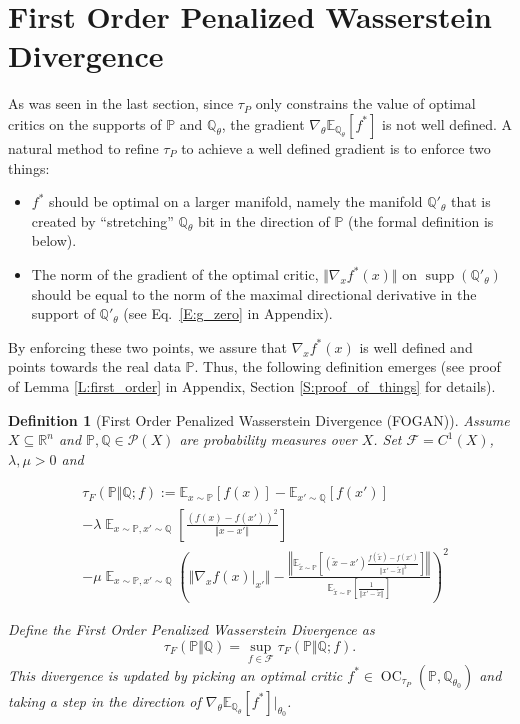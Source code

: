 \documentclass{article}
\DeclareMathOperator{\supp}{supp}
\DeclareMathOperator{\oc}{OC}
\DeclareMathOperator*{\myexpectation}{\mathbb{E}}
\newtheorem{definition}{Definition}
\begin{document}
 \section{First Order Penalized Wasserstein Divergence}\label{S:fo_divergence}
 As was seen in the last section, since $\tau_P$ only constrains the value of optimal critics on the supports of $\mathbb P$ and $\mathbb Q_\theta$,
 the gradient $\nabla_\theta\mathbb E_{\mathbb Q_\theta}[f^*]$ is not well defined. A natural method to refine $\tau_P$ to achieve
 a well defined gradient is to enforce two things:
 \begin{itemize}
  \item $f^*$ should be optimal on a larger manifold, namely the manifold $\mathbb Q'_\theta$ that is created by
 ``stretching'' $\mathbb Q_\theta$ bit in the direction of $\mathbb P$ (the formal definition is below). 
  \item The norm of the gradient of the optimal critic, $\Vert\nabla_x f^*(x) \Vert$ on $\supp(\mathbb Q'_\theta)$ should be equal to the norm of the maximal directional
  derivative in the support of $\mathbb Q'_\theta$ (see Eq.\ \ref{E:g_zero} in Appendix).
 \end{itemize}
 By enforcing these two points, we assure that $\nabla_x f^*(x)$ is well defined and points towards the real data $\mathbb P$. Thus, the following
 definition emerges (see proof of Lemma \ref{L:first_order} in Appendix, Section \ref{S:proof_of_things} for details).
 \begin{definition}[First Order Penalized Wasserstein Divergence (FOGAN)]\label{D:fo_divergence}
  Assume $X\subseteq \mathbb R^n$ and $\mathbb P,\mathbb Q\in\mathcal P(X)$ are probability measures over $X$.
  Set $\mathcal F=C^1(X)$, $\lambda,\mu>0$ and
  \begin{small}
  \begin{align*}
   &\tau_F(\mathbb P\Vert\mathbb Q;f):=\mathbb E_{x\sim\mathbb P}[f(x)]-\mathbb E_{x'\sim\mathbb Q}[f(x')]\\
  &-\lambda\myexpectation_{x\sim\mathbb P,x'\sim\mathbb Q}\left[\frac{(f(x)-f(x'))^2}{\Vert x-x'\Vert}\right] \\
  &-\mu\myexpectation_{x\sim\mathbb P, x'\sim\mathbb Q}\left(\Vert\nabla_x f(x)\big|_{x'}\Vert-
  \frac{\left\Vert\mathbb E_{\tilde x\sim\mathbb P}[(\tilde x- x')\frac{f(\tilde x)-f(x')}{\Vert x'-\tilde x\Vert^3}]\right\Vert}
 {\mathbb E_{\tilde x\sim\mathbb P}[\frac{1}{\Vert x'-\tilde x\Vert}]}
  \right)^2
  \end{align*}
  \end{small}
  Define the First Order Penalized Wasserstein Divergence as
  \[\tau_F(\mathbb P\Vert\mathbb Q)=\sup_{f\in\mathcal F}\tau_F(\mathbb P\Vert\mathbb Q;f).\]
  This divergence is updated by picking an optimal critic $f^*\in\oc_{\tau_P}(\mathbb P,\mathbb Q_{\theta_0})$
  and taking a step in the direction of $\nabla_\theta\mathbb E_{\mathbb Q_\theta}[f^*]|_{\theta_0}$.
 \end{definition}
\end{document}
